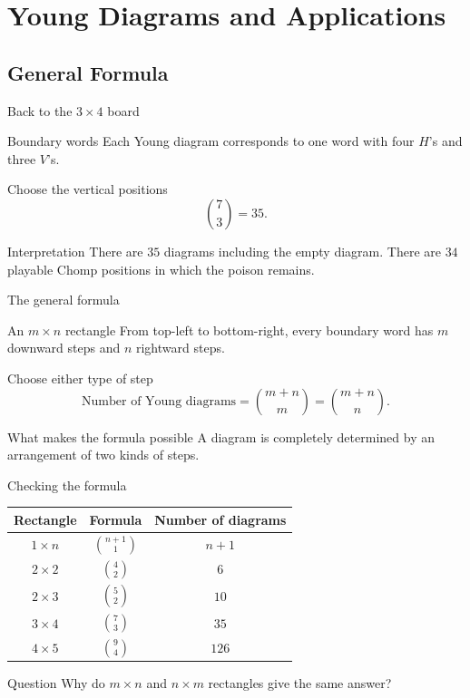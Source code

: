 \documentclass{beamer}
\begin{document}
\section{Young Diagrams and Applications}
\subsection{General Formula}

\begin{frame}{Back to the $3\times4$ board}
  \begin{block}{Boundary words}
    Each Young diagram corresponds to one word with four $H$'s and three $V$'s.
  \end{block}
\pause
  \begin{block}{Choose the vertical positions}
    \[
       \binom{7}{3}=35.
    \]
  \end{block}
\pause
  \begin{block}{Interpretation}
    There are $35$ diagrams including the empty diagram.
    There are $34$ playable Chomp positions in which the poison remains.
  \end{block}
\end{frame}

\begin{frame}{The general formula}
\small
  \begin{block}{An $m\times n$ rectangle}
    From top-left to bottom-right, every boundary word has $m$ downward steps
    and $n$ rightward steps.
  \end{block}
\pause
  \begin{block}{Choose either type of step}
    \[
       \boxed{\text{Number of Young diagrams}
       =\binom{m+n}{m}=\binom{m+n}{n}}.
    \]
  \end{block}
\pause
  \begin{block}{What makes the formula possible}
    A diagram is completely determined by an arrangement of two kinds of steps.
  \end{block}
\end{frame}

\begin{frame}{Checking the formula}
  \begin{center}
    \begin{tabular}{c|c|c}
      Rectangle & Formula & Number of diagrams \\
      \hline
      $1\times n$ & $\binom{n+1}{1}$ & $n+1$ \\
      $2\times2$ & $\binom{4}{2}$ & $6$ \\
      $2\times3$ & $\binom{5}{2}$ & $10$ \\
      $3\times4$ & $\binom{7}{3}$ & $35$ \\
      $4\times5$ & $\binom{9}{4}$ & $126$
    \end{tabular}
  \end{center}
\pause
  \begin{block}{Question}
    Why do $m\times n$ and $n\times m$ rectangles give the same answer?
  \end{block}
\end{frame}
\end{document}
